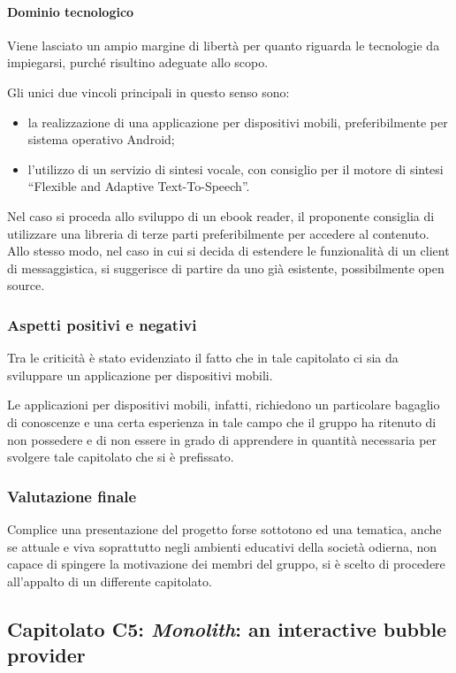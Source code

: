 			\paragraph{Dominio tecnologico}
			Viene lasciato un ampio margine di libertà per quanto riguarda le tecnologie da impiegarsi, purché risultino adeguate allo scopo. 

			Gli unici due vincoli principali in questo senso sono:
			\begin{itemize}
			\item la realizzazione di una applicazione per dispositivi mobili, preferibilmente per sistema operativo Android;
			\item l'utilizzo di un servizio di sintesi vocale, con consiglio per il motore di sintesi “Flexible and Adaptive Text-To-Speech”.
			\end{itemize}
			Nel caso si proceda allo sviluppo di un ebook reader, il proponente consiglia di utilizzare una libreria di terze parti preferibilmente 
			 per accedere al contenuto. Allo stesso modo, nel caso in cui si decida di estendere le funzionalità di un client di messaggistica, 
			si suggerisce di partire da uno già esistente, possibilmente open source.
		\subsubsection{Aspetti positivi e negativi}
		Tra le criticità è stato evidenziato il fatto che in tale capitolato ci sia da sviluppare un applicazione per dispositivi mobili.

		Le applicazioni per dispositivi mobili, infatti, richiedono un particolare bagaglio di conoscenze e una certa esperienza in tale campo che il gruppo ha ritenuto di non possedere e di non essere in grado di apprendere in quantità necessaria per svolgere tale capitolato che si è prefissato.
		
		\subsubsection{Valutazione finale}
		Complice una presentazione del progetto forse sottotono ed una tematica, anche se attuale e viva soprattutto negli ambienti educativi della società odierna, non capace di spingere la motivazione dei membri del gruppo, si è scelto di procedere all'appalto di un differente capitolato.
		
	\subsection{Capitolato C5: \emph{Monolith}: an interactive bubble provider}
